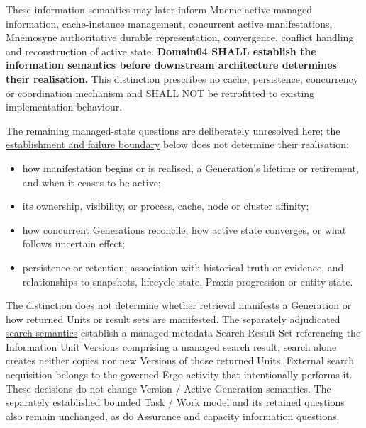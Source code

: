 These information semantics may later inform Mneme active managed information,
cache-instance management, concurrent active manifestations, Mnemosyne
authoritative durable representation, convergence, conflict handling and
reconstruction of active state. \textbf{Domain04 SHALL establish the information
semantics before downstream architecture determines their realisation.} This
distinction prescribes no cache, persistence, concurrency or coordination
mechanism and SHALL NOT be retrofitted to existing implementation behaviour.



The remaining managed-state questions are deliberately unresolved here; the
\href{\detokenize{../../../../../../../../docs/markdown/04-information-architecture/metamodel/information-architecture-metamodel.md#656-establishment-and-semantic-indivisibility}}{establishment and failure boundary}
below does not determine their realisation:



\begin{itemize}


\item how manifestation begins or is realised, a Generation's lifetime or retirement,
  and when it ceases to be active;

\item its ownership, visibility, or process, cache, node or cluster affinity;

\item how concurrent Generations reconcile, how active state converges, or what
  follows uncertain effect;

\item persistence or retention, association with historical truth or evidence,
  and relationships to snapshots, lifecycle state, Praxis progression or
  entity state.

\end{itemize}


The distinction does not determine whether retrieval manifests a Generation
or how returned Units or result sets are manifested. The separately adjudicated
\href{\detokenize{../../../../../../../../docs/markdown/04-information-architecture/patterns/search-results.md}}{search semantics} establish a managed metadata
Search Result Set referencing the Information Unit Versions comprising a
managed search result; search alone creates neither copies nor new Versions
of those returned Units. External search acquisition belongs to the governed
Ergo activity that intentionally performs it. These decisions do not change
Version / Active Generation semantics. The separately established
\href{\detokenize{../../../../../../../../docs/markdown/04-information-architecture/information-families/task-work.md}}{bounded Task / Work model} and its
retained questions also remain unchanged, as do Assurance and capacity
information questions.




